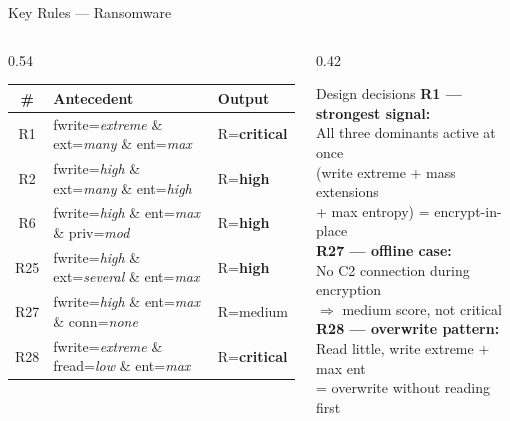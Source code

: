 \documentclass[aspectratio=169,12pt]{beamer}
\begin{document}
\begin{frame}{Key Rules — Ransomware}
  \begin{columns}[T]
    \begin{column}{0.54\textwidth}
      \footnotesize
      \setlength{\tabcolsep}{4pt}
      \renewcommand{\arraystretch}{1.25}
      \begin{tabular}{@{} c p{4.5cm} l @{}}
        \toprule
        \# & Antecedent & Output \\
        \midrule
        R1  & fwrite=\textit{extreme} \& ext=\textit{many} \& ent=\textit{max}
            & R=\textbf{critical} \\
        R2  & fwrite=\textit{high} \& ext=\textit{many} \& ent=\textit{high}
            & R=\textbf{high} \\
        R6  & fwrite=\textit{high} \& ent=\textit{max} \& priv=\textit{mod}
            & R=\textbf{high} \\
        R25 & fwrite=\textit{high} \& ext=\textit{several} \& ent=\textit{max}
            & R=\textbf{high} \\
        R27 & fwrite=\textit{high} \& ent=\textit{max} \& conn=\textit{none}
            & R=medium \\
        R28 & fwrite=\textit{extreme} \& fread=\textit{low} \& ent=\textit{max}
            & R=\textbf{critical} \\
        \bottomrule
      \end{tabular}
    \end{column}
    \begin{column}{0.42\textwidth}
      \begin{alertblock}{\small Design decisions}
        \footnotesize
        \textbf{R1 — strongest signal:}\\
        All three dominants active at once\\
        (write extreme + mass extensions\\
        + max entropy) = encrypt-in-place
        \vspace{0.3em}\\
        \textbf{R27 — offline case:}\\
        No C2 connection during encryption\\
        $\Rightarrow$ medium score, not critical
        \vspace{0.3em}\\
        \textbf{R28 — overwrite pattern:}\\
        Read little, write extreme + max ent\\
        = overwrite without reading first
      \end{alertblock}
    \end{column}
  \end{columns}
\end{frame}
\end{document}
